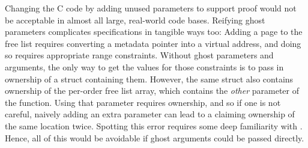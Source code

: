  Changing the C code
by adding unused parameters to support proof would not be acceptable in almost
all large, real-world code bases. Reifying ghost parameters complicates
specifications in tangible ways too: Adding a page to the free list requires
converting a metadata pointer into a virtual address, and doing so requires
appropriate range constraints. Without ghost parameters and arguments, the only
way to get the values for those constraints is to pass in ownership of a struct
containing them. However, the same struct also contains ownership of the
per-order free list array, which contains the \emph{other} parameter of the
function. Using that parameter requires ownership, and so if one is not
careful, naively adding an extra parameter can lead to a claiming ownership of
the same location twice. Spotting this error requires some deep familiarity with .
Hence, all of this would be avoidable if ghost arguments could be
passed directly.

